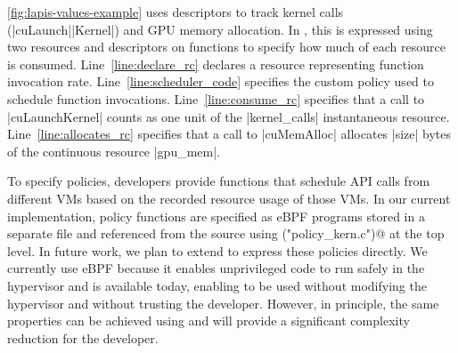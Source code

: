 {\autoref{fig:lapis-values-example} uses descriptors to track kernel calls (\spec|cuLaunch|\-\spec|Kernel|) and GPU memory allocation.
In \speclang, this is expressed using two resources and descriptors on functions to specify how much of each resource is consumed.
Line~\ref{line:declare_rc} declares a resource representing function invocation rate.
Line~\ref{line:scheduler_code} specifies the custom policy used to schedule function invocations.
Line~\ref{line:consume_rc} specifies that a call to \spec|cuLaunchKernel| counts as one unit of the \spec|kernel_calls| instantaneous resource.
Line~\ref{line:allocates_rc} specifies that a call to \spec|cuMemAlloc| allocates \spec|size| bytes of the continuous resource \spec|gpu_mem|.



To specify policies, developers provide functions that schedule API calls from different VMs based on the recorded resource usage of those VMs. In our current implementation, policy functions are specified as eBPF programs stored in a separate file and referenced from the \speclang source using \spec@policy("policy_kern.c")@ at the top level. In future work, we plan
to extend \speclang to express these policies directly. We currently use eBPF because it enables unprivileged code to run
safely in the hypervisor and is available today, enabling \model to be used without modifying the hypervisor and without trusting the developer. However, in principle, the same properties can be achieved using \speclang
and will provide a significant complexity reduction for the developer.





}
